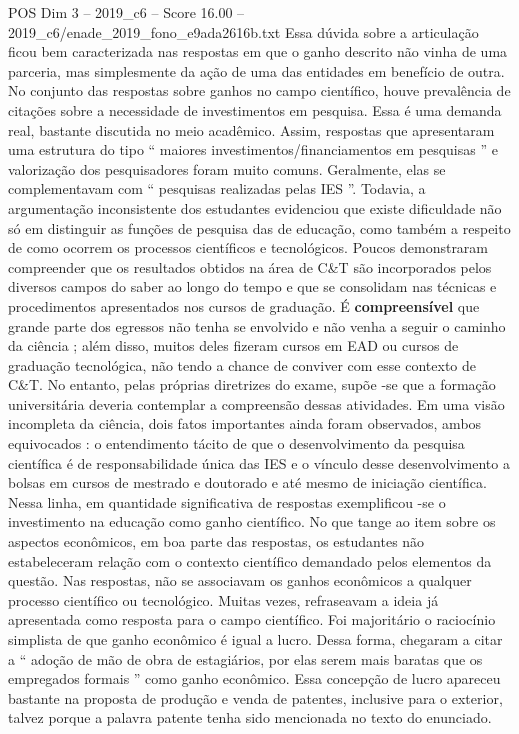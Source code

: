 \begin{textsample}{POS Dim 3 – 2019\_c6 – Score 16.00 – 2019\_c6/enade\_2019\_fono\_e9ada2616b.txt}
Essa dúvida sobre a articulação ficou bem caracterizada nas respostas em que o ganho descrito não vinha de uma parceria, mas simplesmente da ação de uma das entidades em benefício de outra.
No conjunto das respostas sobre ganhos no campo científico, houve prevalência de citações sobre a necessidade de investimentos em pesquisa.
Essa é uma demanda real, bastante discutida no meio acadêmico.
Assim, respostas que apresentaram uma estrutura do tipo “ maiores investimentos/financiamentos em pesquisas ” e valorização dos pesquisadores foram muito comuns.
Geralmente, elas se complementavam com “ pesquisas realizadas pelas IES ”.
Todavia, a argumentação inconsistente dos estudantes evidenciou que existe dificuldade não só em distinguir as funções de pesquisa das de educação, como também a respeito de como ocorrem os processos científicos e tecnológicos.
Poucos demonstraram compreender que os resultados obtidos na área de C\&T são incorporados pelos diversos campos do saber ao longo do tempo e que se consolidam nas técnicas e procedimentos apresentados nos cursos de graduação.
É \textbf{compreensível} que grande parte dos egressos não tenha se envolvido e não venha a seguir o caminho da ciência ; além disso, muitos deles fizeram cursos em EAD ou cursos de graduação tecnológica, não tendo a chance de conviver com esse contexto de C\&T.
No entanto, pelas próprias diretrizes do exame, supõe -se que a formação universitária deveria contemplar a compreensão dessas atividades.
Em uma visão incompleta da ciência, dois fatos importantes ainda foram observados, ambos equivocados : o entendimento tácito de que o desenvolvimento da pesquisa científica é de responsabilidade única das IES e o vínculo desse desenvolvimento a bolsas em cursos de mestrado e doutorado e até mesmo de iniciação científica.
Nessa linha, em quantidade significativa de respostas exemplificou -se o investimento na educação como ganho científico.
No que tange ao item sobre os aspectos econômicos, em boa parte das respostas, os estudantes não estabeleceram relação com o contexto científico demandado pelos elementos da questão.
Nas respostas, não se associavam os ganhos econômicos a qualquer processo científico ou tecnológico.
Muitas vezes, refraseavam a ideia já apresentada como resposta para o campo científico.
Foi majoritário o raciocínio simplista de que ganho econômico é igual a lucro.
Dessa forma, chegaram a citar a “ adoção de mão de obra de estagiários, por elas serem mais baratas que os empregados formais ” como ganho econômico.
Essa concepção de lucro apareceu bastante na proposta de produção e venda de patentes, inclusive para o exterior, talvez porque a palavra patente tenha sido mencionada no texto do enunciado.

\end{textsample}
